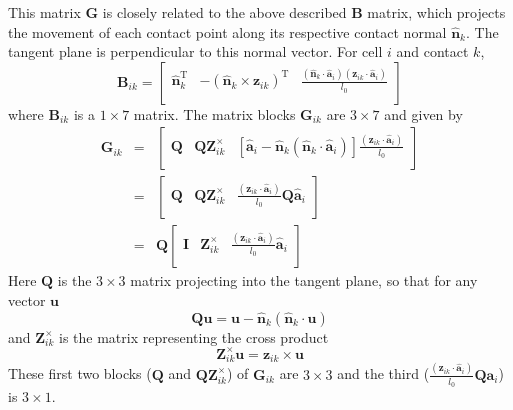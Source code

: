 \documentclass{report}
\let\oldhat\hat
\renewcommand{\vec}[1]{\mathbf{#1}}
\renewcommand{\hat}[1]{\oldhat{\mathbf{#1}}}
\newcommand{\mat}{\mathbf}
\begin{document}
This matrix $\mat{G}$ is closely related to the above described $\mat{B}$
matrix, which projects the movement of each contact point along its respective contact
normal $\hat{n}_k$. The tangent plane is perpendicular to this normal vector.
For cell $i$ and contact $k$,
\begin{equation*}
\mat{B}_{ik} = 
\left[
\begin{array}{lll}
\hat{n}_k^{\textrm{T}} & -\left(\hat{n}_k\times\vec{z}_{ik}\right)^{\textrm{T}} &
\frac{\left(\hat{n}_k\cdot\hat{a}_i\right)\left(\vec{z}_{ik}\cdot\hat{a}_i\right)}{l_0} \\
\end{array}
\right]
\end{equation*}
where $\mat{B}_{ik}$ is a $1\times7$ matrix. The matrix blocks $\mat{G}_{ik}$
are $3\times7$ and given by
\begin{eqnarray*}
\mat{G}_{ik} &=& 
\left[
\begin{array}{lll}
\mat{Q} & \mat{Q}\mat{Z}^\times_{ik} &
\left[\hat{a}_i - \hat{n}_k\left(\hat{n}_k\cdot\hat{a}_i\right)\right] \frac{\left(\vec{z}_{ik}\cdot\hat{a}_i\right)}{l_0} \\
\end{array}
\right]\\
&=&
\left[
\begin{array}{lll}
\mat{Q} & \mat{Q}\mat{Z}^\times_{ik} &
\frac{\left(\vec{z}_{ik}\cdot\hat{a}_i\right)}{l_0} \mat{Q}\hat{a}_i \\
\end{array}
\right]\\
&=& 
\mat{Q}
\left[
\begin{array}{lll}
\mat{I} & \mat{Z}^\times_{ik} &
\frac{\left(\vec{z}_{ik}\cdot\hat{a}_i\right)}{l_0} \hat{a}_i \\
\end{array}
\right]
\end{eqnarray*}
Here $\mat{Q}$ is the $3\times3$ matrix projecting into the tangent plane, so that for any vector
$\vec{u}$
\begin{equation}
\mat{Q}\vec{u} = \vec{u} - \hat{n}_k\left(\hat{n}_k \cdot \vec{u}\right)
\label{eqn:Q}
\end{equation}
and $\mat{Z}^\times_{ik}$ is the matrix representing the cross product
\begin{equation}
\mat{Z}^\times_{ik} \vec{u} = \vec{z}_{ik} \times \vec{u}
\label{eqn:Z}
\end{equation}
These first two blocks ($\mat{Q}$ and $\mat{Q}\mat{Z}^\times_{ik}$) of $\mat{G}_{ik}$ are $3\times3$ and the third 
($\frac{\left(\vec{z}_{ik}\cdot\hat{a}_i\right)}{l_0} \mat{Q}\vec{a}_i$) is
$3\times1$.
\end{document}
